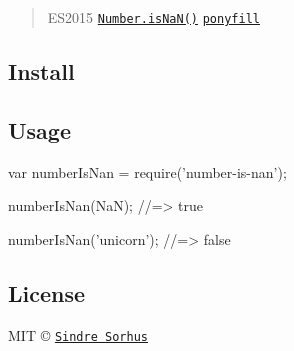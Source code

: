 \begin{quote}
E\+S2015 \href{https://developer.mozilla.org/en-US/docs/Web/JavaScript/Reference/Global_Objects/Number/isNaN}{\tt {\ttfamily Number.\+is\+Na\+N()}} \href{https://ponyfill.com}{\tt ponyfill} \end{quote}


\subsection*{Install}




\subsection*{Usage}


\begin{DoxyCode}
var numberIsNan = require('number-is-nan');

numberIsNan(NaN);
//=> true

numberIsNan('unicorn');
//=> false
\end{DoxyCode}


\subsection*{License}

M\+IT © \href{http://sindresorhus.com}{\tt Sindre Sorhus} 